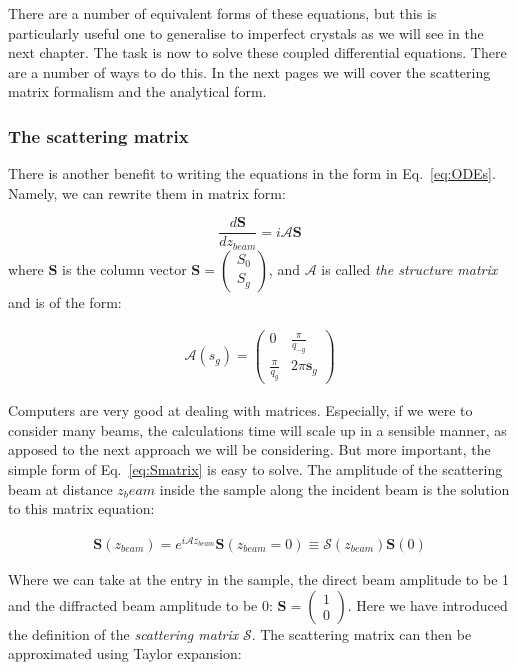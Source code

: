 There are a number of equivalent forms of these equations, but this is particularly useful one to generalise to imperfect crystals as we will see in the next chapter. The task is now to solve these coupled differential equations. There are a number of ways to do this.  In the next pages we will cover  the scattering matrix formalism and the analytical form. 


\subsubsection{The scattering matrix}
There is another benefit to writing the equations in the form in Eq.~\ref{eq:ODEs}. Namely, we can rewrite them in matrix form:

\begin{equation}
\label{eq:Smatrix}
     \frac{d \textbf{S}}{dz_{beam}} = i \mathcal{A} \textbf{S} 
\end{equation}
where $\textbf{S}$ is the column vector $\mathbf{S} = \begin{pmatrix}S_0\\ S_g\end{pmatrix}$, and $\mathcal{A}$ is called \textit{the structure matrix }and is of the form: 

\begin{align}
\mathcal{A}(s_g)=  \begin{pmatrix} 
0 & \frac{\pi}{q_{-g}} \\
\frac{\pi}{q_g} & 2\pi \textbf{s}_g 
\end{pmatrix}
\end{align}

Computers are very good at dealing with matrices. Especially, if we were to consider many beams, the calculations time will scale up in a sensible manner, as apposed to the next approach we will be considering. But more important, the simple form of Eq.~\ref{eq:Smatrix} is easy to solve. The  amplitude of the scattering beam at distance $z_beam$ inside the sample along the incident beam is the solution to this matrix equation:

\begin{align}
\mathbf{S}(z_{beam})=e^{i \mathcal{A} z_{beam}}\mathbf{S}(z_{beam}=0)\equiv \mathcal{S}(z_{beam})\mathbf{S}(0)
\end{align} 

Where we can take at the entry in the sample, the direct beam amplitude to be 1 and the diffracted beam amplitude to be 0: $\mathbf{S} = \begin{pmatrix}1\\ 0\end{pmatrix}$. Here we have introduced the definition of the \textit{scattering matrix} $\mathcal{S}$. The scattering matrix can then be approximated using Taylor expansion:

